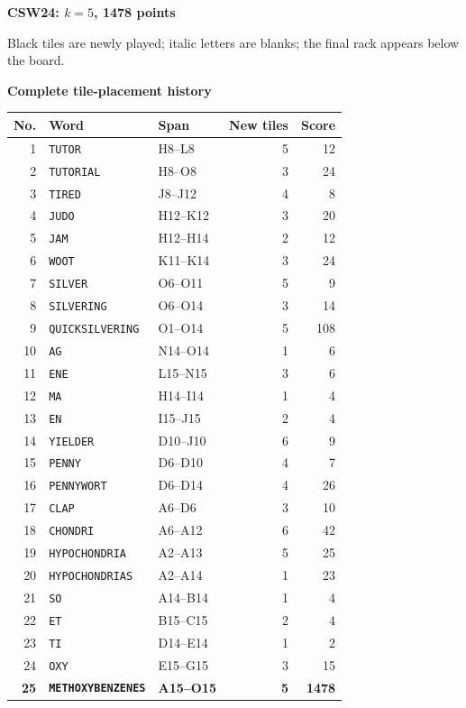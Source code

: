 \documentclass[letterpaper]{article}
\begin{document}
\vfill
\clearpage
\begin{center}
{\fontsize{11}{12}\selectfont\bfseries CSW24: $k=5$, 1478 points\par}
\vspace{2pt}
\par
\vspace{1pt}
{\fontsize{7.2}{8}\selectfont Black tiles are newly played; italic letters are blanks; the final rack appears below the board.\par}
\vspace{2pt}
{\fontsize{8.5}{9}\selectfont\bfseries Complete tile-placement history\par}
\end{center}
\begin{center}
\fontsize{8}{8.15}\selectfont
\setlength{\tabcolsep}{4pt}
\renewcommand{\arraystretch}{0.80}
\begin{tabular}{@{}rllrr@{}}\toprule
No. & Word & Span & New tiles & Score\\
\midrule
1 & \texttt{TUTOR} & H8--L8 & 5 & 12\\
2 & \texttt{TUTORIAL} & H8--O8 & 3 & 24\\
3 & \texttt{TIRED} & J8--J12 & 4 & 8\\
4 & \texttt{JUDO} & H12--K12 & 3 & 20\\
5 & \texttt{JAM} & H12--H14 & 2 & 12\\
6 & \texttt{WOOT} & K11--K14 & 3 & 24\\
7 & \texttt{SILVER} & O6--O11 & 5 & 9\\
8 & \texttt{SILVERING} & O6--O14 & 3 & 14\\
9 & \texttt{QUICKSILVERING} & O1--O14 & 5 & 108\\
10 & \texttt{AG} & N14--O14 & 1 & 6\\
11 & \texttt{ENE} & L15--N15 & 3 & 6\\
12 & \texttt{MA} & H14--I14 & 1 & 4\\
13 & \texttt{EN} & I15--J15 & 2 & 4\\
14 & \texttt{YIELDER} & D10--J10 & 6 & 9\\
15 & \texttt{PENNY} & D6--D10 & 4 & 7\\
16 & \texttt{PENNYWORT} & D6--D14 & 4 & 26\\
17 & \texttt{CLAP} & A6--D6 & 3 & 10\\
18 & \texttt{CHONDRI} & A6--A12 & 6 & 42\\
19 & \texttt{HYPOCHONDRIA} & A2--A13 & 5 & 25\\
20 & \texttt{HYPOCHONDRIAS} & A2--A14 & 1 & 23\\
21 & \texttt{SO} & A14--B14 & 1 & 4\\
22 & \texttt{ET} & B15--C15 & 2 & 4\\
23 & \texttt{TI} & D14--E14 & 1 & 2\\
24 & \texttt{OXY} & E15--G15 & 3 & 15\\
\midrule
\textbf{25} & \textbf{\texttt{METHOXYBENZENES}} & \textbf{A15--O15} & \textbf{5} & \textbf{1478}\\
\bottomrule\end{tabular}
\end{center}
\end{document}
